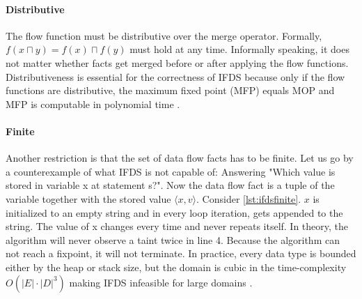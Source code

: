 \documentclass[../draft.tex]{subfiles}
\begin{document}
    \paragraph{Distributive} The flow function must be distributive over the merge operator.
    Formally, $f(x \sqcap y) = f(x) \sqcap f(y)$ must hold at any time.
    Informally speaking, it does not matter whether facts get merged before or after applying the flow functions.
    Distributiveness is essential for the correctness of IFDS because only if the flow functions are distributive, the maximum fixed point (MFP) equals MOP and MFP is computable in polynomial time \cite{Khedker2009,Reps1995}.

    \paragraph{Finite} Another restriction is that the set of data flow facts has to be finite.
    Let us go by a counterexample of what IFDS is not capable of: Answering "Which value is stored in variable x at statement s?".
    Now the data flow fact is a tuple of the variable together with the stored value $\langle x, v \rangle$.
    Consider \autoref{lst:ifdsfinite}.
    $x$ is initialized to an empty string and in every loop iteration,  gets appended to the string.
    The value of x changes every time and never repeats itself.
    In theory, the algorithm will never observe a taint twice in line 4.
    Because the algorithm can not reach a fixpoint, it will not terminate.
    In practice, every data type is bounded either by the heap or stack size, but the domain is cubic in the time-complexity $O(|E| \cdot |D|^3)$ making IFDS infeasible for large domains \cite{Reps1995}.
\end{document}
